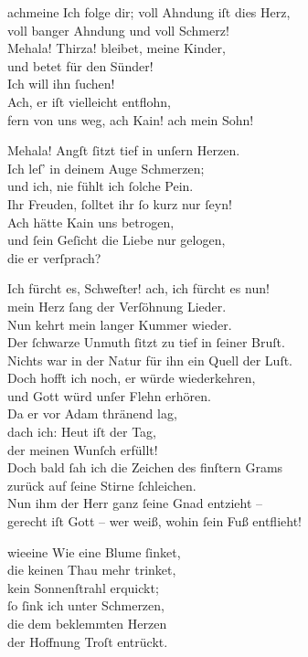 \documentclass[tocstyle=ref-genre]{ees}
\begin{document}
{\begin{movement}{achmeine}
  \voice[Eva]
  Ich folge dir; voll Ahndung iſt dies Herz,\\
  voll banger Ahndung und voll Schmerz!\\
  Mehala! Thirza! bleibet, meine Kinder,\\
  und betet für den Sünder!\\
  Ich will ihn ſuchen!\\
  Ach, er iſt vielleicht entflohn,\\
  fern von uns weg, ach Kain! ach mein Sohn!

  \voice[Thirza]
  Mehala! Angſt ſitzt tief in unſern Herzen.\\
  Ich leſ’ in deinem Auge Schmerzen;\\
  und ich, nie fühlt ich ſolche Pein.\\
  Ihr Freuden, ſolltet ihr ſo kurz nur ſeyn!\\
  Ach hätte Kain uns betrogen,\\
  und ſein Geſicht die Liebe nur gelogen,\\
  die er verſprach?

  \voice[Mehala]
  Ich fürcht es, Schweſter! ach, ich fürcht es nun!\\
  mein Herz ſang der Verſöhnung Lieder.\\
  Nun kehrt mein langer Kummer wieder.\\
  Der ſchwarze Unmuth ſitzt zu tief in ſeiner Bruſt.\\
  Nichts war in der Natur für ihn ein Quell der Luſt.\\
  Doch hofft ich noch, er würde wiederkehren,\\
  und Gott würd unſer Flehn erhören.\\
  Da er vor Adam thränend lag,\\
  dach ich: Heut iſt der Tag,\\
  der meinen Wunſch erfüllt!\\
  Doch bald ſah ich die Zeichen des finſtern Grams\\
  zurück auf ſeine Stirne ſchleichen.\\
  Nun ihm der Herr ganz ſeine Gnad entzieht –\\
  gerecht iſt Gott – wer weiß, wohin ſein Fuß entflieht!
\end{movement}

\begin{movement}{wieeine}
  \voice[Mehala]
  Wie eine Blume ſinket,\\
  die keinen Thau mehr trinket,\\
  kein Sonnenſtrahl erquickt;\\
  ſo ſink ich unter Schmerzen,\\
  die dem beklemmten Herzen\\
  der Hoffnung Troſt entrückt.
\end{movement}



}

\eesScore
\end{document}

